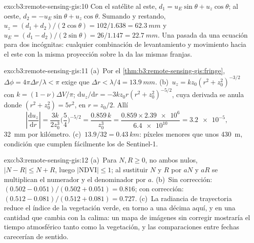 \begin{solution}{exo:b3:remote-sensing-gis:10}
Con el satélite al este, $d_1 = u_E\sin\theta + u_z\cos\theta$; al
oeste, $d_2 = -u_E\sin\theta + u_z\cos\theta$. Sumando y restando,
$u_z = (d_1 + d_2)/(2\cos\theta) = 102/1.638 = \qty{62.3}{mm}$ y $u_E =
(d_1 - d_2)/(2\sin\theta) = 26/1.147 = \qty{22.7}{mm}$. Una pasada da una
ecuación para dos incógnitas: cualquier combinación de levantamiento y movimiento hacia el este con
la misma proyección sobre la  da las mismas franjas.
\end{solution}

\begin{solution}{exo:b3:remote-sensing-gis:11}
(a)~Por el \cref{thm:b3:remote-sensing-gis:fringe}, $\Delta\phi =
4\pi\Delta r/\lambda < \pi$ exige que $\Delta r < \lambda/4 =
\qty{13.9}{mm}$. (b)~$u_z = k z_0(r^2 + z_0^2)^{-3/2}$ con $k = (1 -
\nu)\Delta V/\pi$; $\mathrm du_z/\mathrm dr = -3kz_0r(r^2 + z_0^2)^{-5/2}$,
cuya derivada se anula donde $(r^2 + z_0^2) = 5r^2$, en $r = z_0/2$. Allí
\[
\left|\frac{\mathrm du_z}{\mathrm dr}\right| = \frac{3k}{2z_0^3}\Big(\frac54\Big)^{-5/2}
= \frac{0.859\,k}{z_0^3} = \frac{0.859\times\num{2.39e6}}{\num{6.4e10}} = \num{3.2e-5},
\]
\qty{32}{mm} por kilómetro. (c)~$13.9/32 = \qty{0.43}{km}$: píxeles menores
que unos \qty{430}{m}, condición que cumplen fácilmente los de Sentinel-1.
\end{solution}

\begin{solution}{exo:b3:remote-sensing-gis:12}
(a)~Para $N, R \ge 0$, no ambos nulos, $|N - R| \le N + R$, luego $|\mathrm{NDVI}|
\le 1$; al sustituir $N$ y $R$ por $aN$ y $aR$ se multiplican el numerador y
el denominador por $a$. (b)~Sin corrección: $(0.502 - 0.051)/(0.502 + 0.051) =
0.816$; con corrección: $(0.512 - 0.081)/(0.512 + 0.081) = 0.727$. (c)~La radiancia
de trayectoria reduce el índice de la vegetación verde, en torno a una décima aquí, y
en una cantidad que cambia con la calima: un mapa de imágenes sin corregir mostraría
el tiempo atmosférico tanto como la vegetación, y las comparaciones entre fechas
carecerían de sentido.
\end{solution}

